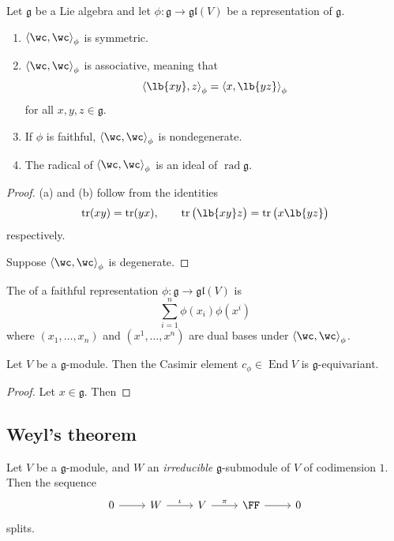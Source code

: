 \documentclass{article}
\newcommand\ip[1]{\left\langle{#1}\right\rangle}
\DeclarePairedDelimiter\lb\lbrack\rbrack
\DeclareMathOperator{\End}{End}
\DeclareMathOperator{\tr}{tr}
\DeclareMathOperator{\rad}{rad}
\newcommand*\frkg{{\ensuremath{\mathfrak{g}}}}
\newcommand*\gl{\ensuremath{\mathfrak{gl}}}
\begin{document}
\begin{proposition}
    Let $\frkg$ be a Lie algebra and let $\phi: \frkg \to \gl(V)$ be a representation of $\frkg$.
    \begin{enumerate}[label=(\alph*)]
        \item 
            $\ip{\wc,\wc}_\phi$ is symmetric.
        \item 
            $\ip{\wc,\wc}_\phi$ is associative, meaning that
            \[
                \ip{\lb{xy},z}_\phi
                =
                \ip{x,\lb{yz}}_\phi
            \]
            for all $x,y,z \in \frkg$.
        \item 
            If $\phi$ is faithful, $\ip{\wc,\wc}_\phi$ is nondegenerate.
        \item 
            The radical of $\ip{\wc,\wc}_\phi$ is an ideal of $\rad \frkg$.
    \end{enumerate}
\end{proposition}

\begin{proof}
    (a) and (b) follow from the identities
    \[
        \tr(xy) 
        = 
        \tr(yx),\qquad
        \tr\big(\lb{xy}z\big)
        =
        \tr\big(x\lb{yz}\big)
    \]
    respectively.

    Suppose $\ip{\wc,\wc}_\phi$ is degenerate.
    
\end{proof}

\begin{definition}
    The  of a faithful representation $\phi: \frkg \to \gl(V)$ is
    \[
        \sum_{i=1}^n
        \phi(x_i)\phi(x^i)
    \]
    where $(x_1,\ldots,x_n)$ and $(x^1, \ldots, x^n)$ are dual bases under $\ip{\wc,\wc}_\phi$.
\end{definition}

\begin{proposition}
    Let $V$ be a $\frkg$-module.
    Then the Casimir element $c_\phi \in \End V$ is $\frkg$-equivariant.
\end{proposition}

\begin{proof}
    Let $x \in \frkg$.
    Then
\end{proof}

\subsection{Weyl's theorem}

\begin{lemma}
    Let $V$ be a $\frkg$-module, and $W$ an \textit{irreducible} $\frkg$-submodule of $V$ of codimension $1$.
    Then the sequence
    \[
        \begin{tikzcd}
            0 \arrow[r] & W \arrow[r, "\iota"] & V \arrow[r, "\pi"] & \FF \arrow[r] & 0
\end{tikzcd}
    \]
    splits.
\end{lemma}
\end{document}
